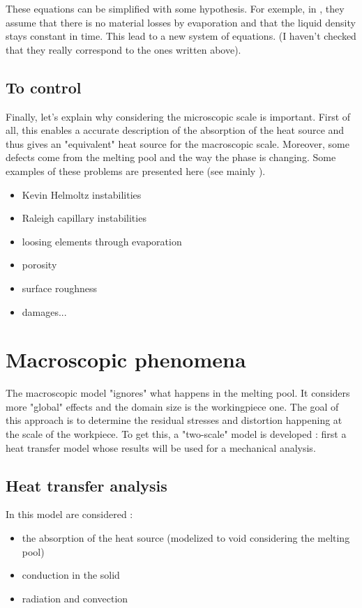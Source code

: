 \documentclass[11pt,a4paper]{article}
\begin{document}
These equations can be simplified with some hypothesis. For exemple, in \cite{DebRoyAdditivemanufacturingmetallic2018}, they assume that there is no material losses by evaporation and that the liquid density stays constant in time. This lead to a new system of equations. (I haven't checked that they really correspond to the ones written above).


\subsection{To control}
Finally, let's explain why considering the microscopic scale is important. First of all, this enables a accurate description of the absorption of the heat source and thus gives an "equivalent" heat source for the macroscopic scale. Moreover, some defects come from the melting pool and the way the phase is changing. Some examples of these problems are presented here (see mainly \cite{DebRoyAdditivemanufacturingmetallic2018}).
\begin{itemize}
	\item Kevin Helmoltz instabilities
	\item Raleigh capillary instabilities
	\item loosing elements through evaporation
	\item porosity
	\item surface roughness
	\item damages...
\end{itemize}




\section{Macroscopic phenomena}

The macroscopic model "ignores" what happens in the melting pool. It considers more "global" effects and the domain size is the workingpiece one. The goal of this approach is to determine the residual stresses and distortion happening at the scale of the workpiece. To get this, a "two-scale" model is developed : first a heat transfer model whose results will be used for a mechanical analysis. 

\subsection{Heat transfer analysis}

In this model are considered :
\begin{itemize}
	\item the absorption of the heat source (modelized to void considering the melting pool)
	\item conduction in the solid
	\item radiation and convection
\end{itemize}
\end{document}
